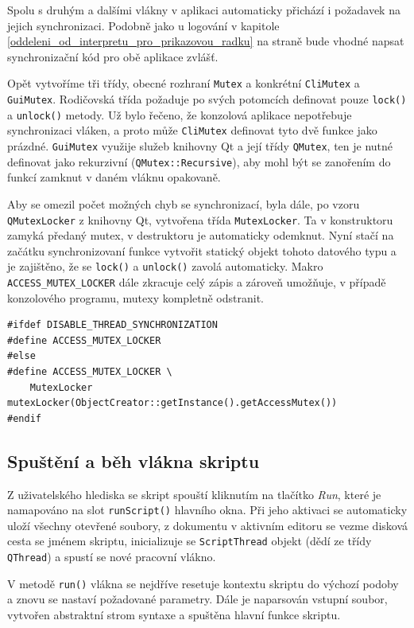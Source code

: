 \documentclass[11pt,twoside,a4paper]{book}
\begin{document}
Spolu s druhým a dalšími vlákny v aplikaci automaticky přichází i požadavek na jejich synchronizaci. Podobně jako u logování v kapitole \ref{oddeleni_od_interpretu_pro_prikazovou_radku} na straně \pageref{oddeleni_od_interpretu_pro_prikazovou_radku} bude vhodné napsat synchronizační kód pro obě aplikace zvlášť.

Opět vytvoříme tři třídy, obecné rozhraní \texttt{Mutex} a konkrétní \texttt{CliMutex} a \texttt{GuiMutex}. Ro\-di\-čov\-ská třída požaduje po svých potomcích definovat pouze \texttt{lock()} a \texttt{unlock()} metody. Už bylo řečeno, že konzolová aplikace nepotřebuje synchronizaci vláken, a proto může \texttt{CliMutex} definovat tyto dvě funkce jako prázdné. \texttt{GuiMutex} využije služeb knihovny Qt a její třídy \texttt{QMutex}, ten je nutné definovat jako rekurzivní (\texttt{QMutex::Recursive}), aby mohl být se zanořením do funkcí zamknut v daném vláknu opakovaně.

Aby se omezil počet možných chyb se synchronizací, byla dále, po vzoru \texttt{QMu\-tex\-Loc\-ker} z knihovny Qt, vytvořena třída \texttt{MutexLocker}. Ta v konstruktoru zamyká předaný mutex, v destruktoru je automaticky odemknut. Nyní stačí na začátku synchronizovaní funkce vytvořit statický objekt tohoto datového typu a je zajištěno, že se \texttt{lock()} a \texttt{unlock()} zavolá automaticky. Makro \texttt{ACCESS\_MUTEX\_LOCKER} dále zkracuje celý zápis a zároveň umožňuje, v případě konzolového programu, mutexy kompletně odstranit.

\begin{verbatim}
#ifdef DISABLE_THREAD_SYNCHRONIZATION
#define ACCESS_MUTEX_LOCKER
#else
#define ACCESS_MUTEX_LOCKER \
    MutexLocker mutexLocker(ObjectCreator::getInstance().getAccessMutex())
#endif
\end{verbatim}


\subsection{Spuštění a běh vlákna skriptu}

Z uživatelského hlediska se skript spouští kliknutím na tlačítko \textit{Run}, které je namapováno na slot \texttt{runScript()} hlavního okna. Při jeho aktivaci se automaticky uloží všechny otevřené soubory, z dokumentu v aktivním editoru se vezme disková cesta se jménem skriptu, inicializuje se \texttt{ScriptThread} objekt (dědí ze třídy \texttt{QThread}) a spustí se nové pracovní vlákno.

V metodě \texttt{run()} vlákna se nejdříve resetuje kontextu skriptu do výchozí podoby a znovu se nastaví požadované parametry. Dále je naparsován vstupní soubor, vytvořen abstraktní strom syntaxe a spuštěna hlavní funkce skriptu.
\end{document}
